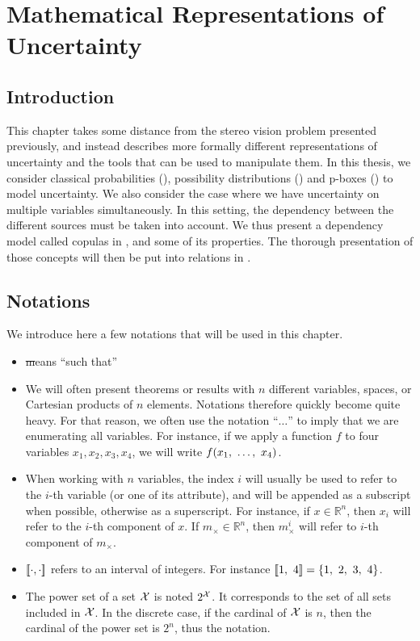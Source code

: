 \chapter{Mathematical Representations of Uncertainty}\label{chap:representation_of_uncertainty}

\section{Introduction}
This chapter takes some distance from the stereo vision problem presented previously, and instead describes more formally different representations of uncertainty and the tools that can be used to manipulate them. In this thesis, we consider classical probabilities (), possibility distributions () and p-boxes () to model uncertainty. We also consider the case where we have uncertainty on multiple variables simultaneously. In this setting, the dependency between the different sources must be taken into account. We thus present a dependency model called copulas in , and some of its properties. The thorough presentation of those concepts will then be put into relations in . 

\section{Notations}
We introduce here a few notations that will be used in this chapter.
\begin{itemize}
    \item \st means ``such that''
    \item We will often present theorems or results with $n$ different variables, spaces, or Cartesian products of $n$ elements. Notations therefore quickly become quite heavy. For that reason, we often use the notation ``$\ldots$'' to imply that we are enumerating all variables. For instance, if we apply a function $f$ to four variables $x_1, x_2, x_3, x_4$, we will write $f(x_1, ~\ldots, ~ x_4)$.
    \item When working with $n$ variables, the index $i$ will usually be used to refer to the $i$-th variable (or one of its attribute), and will be appended as a subscript when possible, otherwise as a superscript. For instance, if $x\in\mathbb{R}^n$, then $x_i$ will refer to the $i$-th component of $x$. If $m_\times\in\mathbb{R}^n$, then $m_\times^i$ will refer to $i$-th component of $m_\times$.
    \item $[\![\cdot,\cdot]\!]$ refers to an interval of integers. For instance $[\![1,~4]\!]=\{1,~2,~3,~4\}$.
    \item The power set of a set $\mathcal{X}$ is noted $2^{\mathcal{X}}$. It corresponds to the set of all sets included in $\mathcal{X}$. In the discrete case, if the cardinal of $\mathcal{X}$ is $n$, then the cardinal of the power set is $2^n$, thus the notation.
\end{itemize}


